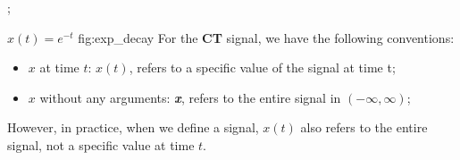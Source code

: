                 {
                    \begin{axis}[
                        compat=1.17,
                        axis lines=middle,
                        xtick=\empty,  %
                        ytick=\empty,  %
                        ymin=-1,
                        ymax=8, 
                        xmin=-2.5,
                        xmax=5,
                        clip=false, 
                        xlabel=$t$,
                        xlabel style={
                            at={(ticklabel* cs:1.0)},
                            anchor=north,
                        },
                        ylabel={$x(t)$},
                        ylabel style={
                            at={(ticklabel* cs:1.0)},
                            anchor=east,
                            rotate=0,
                        },
                    ]
                    ;
                    \end{axis}
                } 
                {$x(t)=e^{-t}$}
                {fig:exp_decay}
        \noindent For the \textbf{CT} signal, we have the following conventions:
            \begin{itemize}
                \item $x$ at time $t$: $x(t)$, refers to a specific value of the signal at time t;
                \item $x$ without any arguments: \textbf{\emph{x}}, refers to the entire signal in $(-\infty, \infty)$;
            \end{itemize}
        However, in practice, when we define a signal, $x(t)$ also refers to the entire signal, 
        not a specific value at time $t$.

